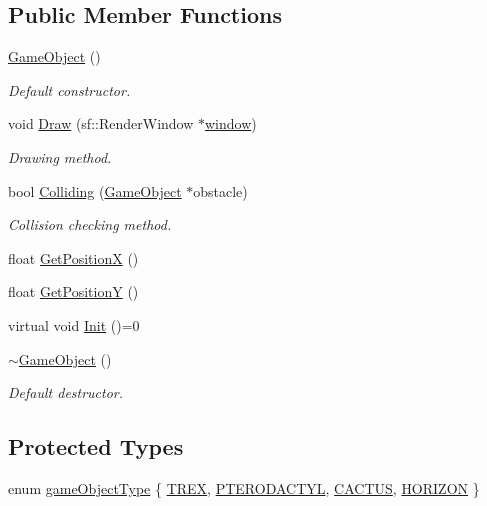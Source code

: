 \subsection*{Public Member Functions}
\begin{DoxyCompactItemize}
\item 
\mbox{\hyperlink{class_game_object_a0348e3ee2e83d56eafca7a3547f432c4}{Game\+Object}} ()
\begin{DoxyCompactList}\small\item\em Default constructor. \end{DoxyCompactList}\item 
void \mbox{\hyperlink{class_game_object_a7ba982dd7315ab822c18dd9892112316}{Draw}} (sf\+::\+Render\+Window $\ast$\mbox{\hyperlink{_game_8cpp_a0ee270ff2fb6cd89fc012e05a882cecf}{window}})
\begin{DoxyCompactList}\small\item\em Drawing method. \end{DoxyCompactList}\item 
bool \mbox{\hyperlink{class_game_object_a9f63ba7fa09d165f175858276f71d44b}{Colliding}} (\mbox{\hyperlink{class_game_object}{Game\+Object}} $\ast$obstacle)
\begin{DoxyCompactList}\small\item\em Collision checking method. \end{DoxyCompactList}\item 
float \mbox{\hyperlink{class_game_object_a274bf74e1658d845a0603be2972a63c4}{Get\+PositionX}} ()
\item 
float \mbox{\hyperlink{class_game_object_abe7e418773edb98562033fcfdf191dd9}{Get\+PositionY}} ()
\item 
virtual void \mbox{\hyperlink{class_game_object_ab3b70fcc4e640ba2081508b1efb35536}{Init}} ()=0
\item 
\mbox{\hyperlink{class_game_object_ab82dfdb656f9051c0587e6593b2dda97}{$\sim$\+Game\+Object}} ()
\begin{DoxyCompactList}\small\item\em Default destructor. \end{DoxyCompactList}\end{DoxyCompactItemize}
\subsection*{Protected Types}
\begin{DoxyCompactItemize}
\item 
enum \mbox{\hyperlink{class_game_object_ad5092169e581fb0772e01026882ea0c8}{game\+Object\+Type}} \{ \mbox{\hyperlink{class_game_object_ad5092169e581fb0772e01026882ea0c8abe36792af4e9d553af5ca98543c8a575}{T\+R\+EX}}, 
\mbox{\hyperlink{class_game_object_ad5092169e581fb0772e01026882ea0c8a23766b7dba368bcb74cc89b61a9b644a}{P\+T\+E\+R\+O\+D\+A\+C\+T\+YL}}, 
\mbox{\hyperlink{class_game_object_ad5092169e581fb0772e01026882ea0c8ab187712fdeb8f34d8ef73351e8228a6c}{C\+A\+C\+T\+US}}, 
\mbox{\hyperlink{class_game_object_ad5092169e581fb0772e01026882ea0c8a3bfa9bed5a5f60ee2ddcd61846d23b01}{H\+O\+R\+I\+Z\+ON}}
 \}
\end{DoxyCompactItemize}
